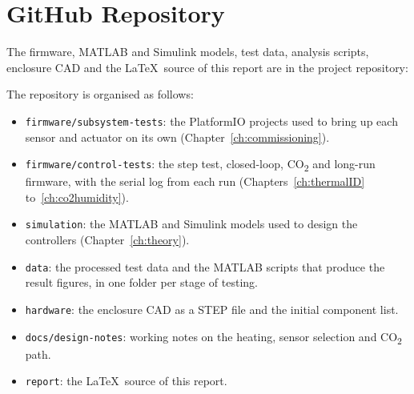 \chapter{GitHub Repository}
\label{app:github}

The firmware, MATLAB and Simulink models, test data, analysis scripts, enclosure CAD and the \LaTeX\ source of this report are in the project repository:

\begin{center}
    \gitrepo
\end{center}

\noindent The repository is organised as follows:

\begin{itemize}[nosep]
    \item \texttt{firmware/subsystem-tests}: the PlatformIO projects used to bring up each sensor and actuator on its own (Chapter~\ref{ch:commissioning}).
    \item \texttt{firmware/control-tests}: the step test, closed-loop, CO\textsubscript{2} and long-run firmware, with the serial log from each run (Chapters~\ref{ch:thermalID} to~\ref{ch:co2humidity}).
    \item \texttt{simulation}: the MATLAB and Simulink models used to design the controllers (Chapter~\ref{ch:theory}).
    \item \texttt{data}: the processed test data and the MATLAB scripts that produce the result figures, in one folder per stage of testing.
    \item \texttt{hardware}: the enclosure CAD as a STEP file and the initial component list.
    \item \texttt{docs/design-notes}: working notes on the heating, sensor selection and CO\textsubscript{2} path.
    \item \texttt{report}: the \LaTeX\ source of this report.
\end{itemize}
